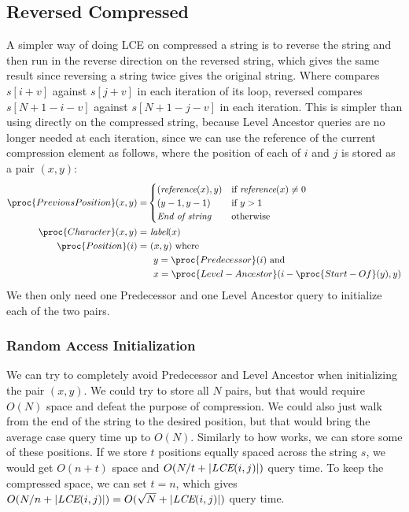 \documentclass[a4]{article}
\begin{document}
\subsection{Reversed Compressed }

A simpler way of doing LCE on compressed a string is to reverse the string and then run  in the reverse direction on the reversed string, which gives the same result since reversing a string twice gives the original string. Where  compares $s[i+v]$ against $s[j+v]$ in each iteration of its loop, reversed  compares $s[N+1-i-v]$ against $s[N+1-j-v]$ in each iteration. This is simpler than using  directly on the compressed string, because Level Ancestor queries are no longer needed at each iteration, since we can use the reference of the current compression element as follows, where the position of each of $i$ and $j$ is stored as a pair $(x,y)$:
\begin{align*}
\proc{PreviousPosition}(x, y)=&
\begin{cases}
(\zreference(x), y) & \textrm{if} ~ \zreference(x) \neq 0 \\
(y-1, y-1) & \textrm{if} ~ y > 1\\
\textit{End of string} & \textrm{otherwise}
\end{cases}\\
\proc{Character}(x, y)=&~\zlabel(x)\\
\proc{Position}(i)=&~(x,y)~\textrm{where}\\
&~~y=\proc{Predecessor}(i)~\textrm{and}\\
&~~x=\proc{Level-Ancestor}(i-\proc{Start-Of}(y), y)
\end{align*}
We then only need one Predecessor and one Level Ancestor query to initialize each of the two pairs.

\subsubsection{Random Access Initialization}

We can try to completely avoid Predecessor and Level Ancestor when initializing the pair $(x,y)$. We could try to store all $N$ pairs, but that would require $O(N)$ space and defeat the purpose of compression. We could also just walk from the end of the string to the desired position, but that would bring the average case query time up to $O(N)$. Similarly to how  works, we can store some of these positions. If we store $t$ positions equally spaced across the string $s$, we would get $O(n+t)$ space and $O(N/t+|\textit{LCE}(i,j)|)$ query time. To keep the compressed space, we can set $t=n$, which gives $O(N/n+|\textit{LCE}(i,j)|) = O(\sqrt{N}+|\textit{LCE}(i,j)|)$ query time. 
\end{document}
